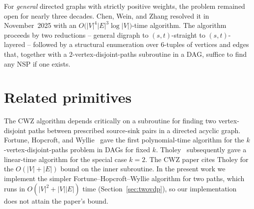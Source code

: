 For \emph{general} directed graphs with strictly positive weights, the
problem remained open for nearly three decades. Chen, Wein, and Zhang
\cite{ChenWeinZhang2025} resolved it in November~2025 with an
$O\bigl(|V|^{4}|E|^{3}\log|V|\bigr)$-time algorithm. The algorithm proceeds
by two reductions -- general digraph to $(s,t)$-straight to $(s,t)$-layered
-- followed by a structural enumeration over $6$-tuples of vertices and
edges that, together with a $2$-vertex-disjoint-paths subroutine in a DAG,
suffice to find any NSP if one exists.

\section{Related primitives}

The CWZ algorithm depends critically on a subroutine for finding two
vertex-disjoint paths between prescribed source-sink pairs in a directed
acyclic graph. Fortune, Hopcroft, and Wyllie~\cite{FortuneHopcroftWyllie1980}
gave the first polynomial-time algorithm for the $k$-vertex-disjoint-paths
problem in DAGs for fixed $k$. Tholey~\cite{Tholey2012} subsequently gave a
linear-time algorithm for the special case $k=2$. The CWZ paper cites Tholey
for the $O(|V|+|E|)$ bound on the inner subroutine. In the present work we
implement the simpler Fortune--Hopcroft--Wyllie algorithm for two paths,
which runs in $O(|V|^{2}+|V||E|)$ time (Section~\ref{sec:twovdp}), so our
implementation does not attain the paper's bound.
